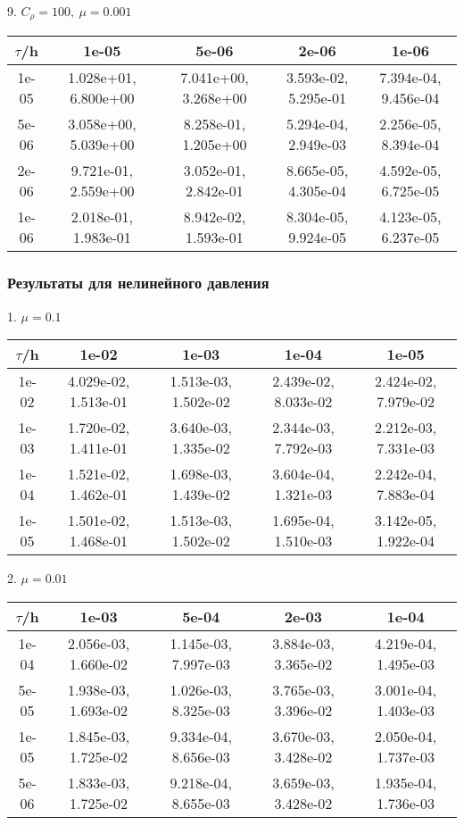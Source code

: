 9. $C_{\rho} = 100, \ \mu = 0.001$
\begin{center}
	\begin{tabular}{|c|c|c|c|c|} 
		\hline
		$\tau$/h & 1e-05 & 5e-06 & 2e-06 & 1e-06 \\ 
		\hline
		1e-05 & 1.028e+01,  6.800e+00 & 7.041e+00, 3.268e+00 & 3.593e-02, 5.295e-01 & 7.394e-04, 9.456e-04\\ 
		\hline
		5e-06 & 3.058e+00,  5.039e+00 & 8.258e-01, 1.205e+00 &5.294e-04, 2.949e-03  & 2.256e-05, 8.394e-04\\ 
		\hline
		2e-06 & 9.721e-01, 2.559e+00 & 3.052e-01, 2.842e-01 & 8.665e-05, 4.305e-04 & 4.592e-05, 6.725e-05\\ 
		\hline
		1e-06 & 2.018e-01,  1.983e-01 & 8.942e-02, 1.593e-01 & 8.304e-05, 9.924e-05 & 4.123e-05, 6.237e-05\\ 
		\hline
	\end{tabular}
\end{center}


\subsubsection{Результаты для нелинейного давления}
1. $\mu = 0.1$
\begin{center}
	\begin{tabular}{|c|c|c|c|c|} 
		\hline
		$\tau$/h & 1e-02 & 1e-03 & 1e-04 & 1e-05 \\ 
		\hline
		1e-02 & 4.029e-02,  1.513e-01 & 1.513e-03,  1.502e-02 & 2.439e-02,  8.033e-02 & 2.424e-02,  7.979e-02\\ 
		\hline
		1e-03 & 1.720e-02,  1.411e-01 & 3.640e-03,  1.335e-02 & 2.344e-03,  7.792e-03 & 2.212e-03,  7.331e-03\\ 
		\hline
		1e-04 & 1.521e-02,  1.462e-01 & 1.698e-03,  1.439e-02 & 3.604e-04,  1.321e-03 & 2.242e-04,  7.883e-04\\ 
		\hline
		1e-05 & 1.501e-02,  1.468e-01 & 1.513e-03,  1.502e-02 & 1.695e-04,  1.510e-03 & 3.142e-05,  1.922e-04\\ 
		\hline
	\end{tabular}
\end{center}


2. $\mu = 0.01$
\begin{center}
	\begin{tabular}{|c|c|c|c|c|} 
		\hline
		$\tau$/h & 1e-03 & 5e-04 & 2e-03 & 1e-04 \\ 
		\hline
		1e-04 & 2.056e-03,  1.660e-02 & 1.145e-03,  7.997e-03 & 3.884e-03,  3.365e-02 & 4.219e-04,  1.495e-03\\ 
		\hline
		5e-05 & 1.938e-03,  1.693e-02 & 1.026e-03,  8.325e-03 & 3.765e-03,  3.396e-02 & 3.001e-04,  1.403e-03\\ 
		\hline
		1e-05 & 1.845e-03,  1.725e-02 & 9.334e-04,  8.656e-03 & 3.670e-03,  3.428e-02 & 2.050e-04,  1.737e-03\\ 
		\hline
		5e-06 & 1.833e-03,  1.725e-02 & 9.218e-04,  8.655e-03 & 3.659e-03,  3.428e-02 & 1.935e-04,  1.736e-03\\ 
		\hline
	\end{tabular}
\end{center}

